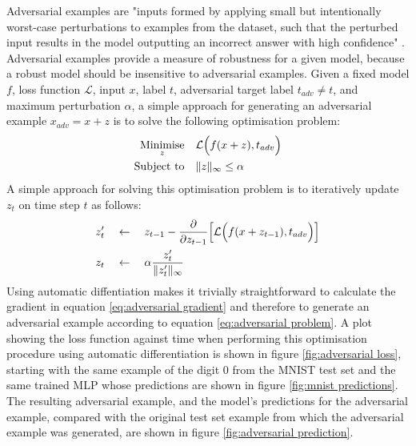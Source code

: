 Adversarial examples are "inputs formed by applying small but intentionally worst-case perturbations to examples from the dataset, such that the perturbed input results in the model outputting an incorrect answer with high confidence" \cite{goodfellow2014explaining}. Adversarial examples provide a measure of robustness for a given model, because a robust model should be insensitive to adversarial examples. Given a fixed model $f$, loss function $\mathcal{L}$, input $x$, label $t$, adversarial target label $t_{adv}\ne t$, and maximum perturbation $\alpha$, a simple approach for generating an adversarial example $x_{adv}=x+z$ is to solve the following optimisation problem:
\begin{equation}
\begin{aligned}
    \underset{z}{\text{Minimise}} \quad & \mathcal{L}\Bigl( f(x+z), t_{adv} \Bigr) \\
    \text{Subject to} \quad & \Vert z \Vert_\infty \le \alpha
\end{aligned} \label{eq:adversarial problem}
\end{equation}
A simple approach for solving this optimisation problem is to iteratively update $z_t$ on time step $t$ as follows:
\begin{align}
    z_t' \quad &\leftarrow \quad z_{t-1} - \frac{\partial}{\partial z_{t-1}}\Bigl[ \mathcal{L}\Bigl( f(x+z_{t-1}), t_{adv} \Bigr) \Bigr] \label{eq:adversarial gradient}\\
    z_t \quad &\leftarrow \quad \alpha \frac{z_t'}{\Vert z_t' \Vert_\infty}
\end{align}
Using automatic diffentiation makes it trivially straightforward to calculate the gradient in equation \ref{eq:adversarial gradient} and therefore to generate an adversarial example according to equation \ref{eq:adversarial problem}. A plot showing the loss function against time when performing this optimisation procedure using automatic differentiation is shown in figure \ref{fig:adversarial loss}, starting with the same example of the digit 0 from the MNIST test set and the same trained MLP whose predictions are shown in figure \ref{fig:mnist predictions}. The resulting adversarial example, and the model's predictions for the adversarial example, compared with the original test set example from which the adversarial example was generated, are shown in figure \ref{fig:adversarial prediction}.
